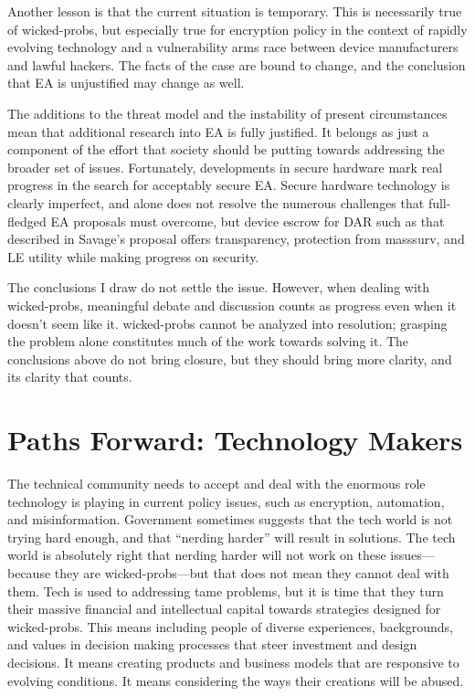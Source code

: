 Another lesson is that the current situation is temporary. This is necessarily true of \acp{wicked-prob}, but especially
true for encryption policy in the context of rapidly evolving technology and a vulnerability arms race between device
manufacturers and lawful hackers. The facts of the case are bound to change, and the conclusion that \ac{EA} is
unjustified may change as well.

The additions to the threat model and the instability of present circumstances mean that additional research into
\ac{EA} is fully justified. It belongs as just a component of the effort that society should be putting towards
addressing the broader set of issues. Fortunately, developments in secure hardware mark real progress in the search for
acceptably secure \ac{EA}. Secure hardware technology is clearly imperfect, and alone does not resolve the numerous
challenges that full-fledged \ac{EA} proposals must overcome, but device escrow for \acl{DAR} such as that described in
Savage's proposal offers transparency, protection from \ac{masssurv}, and \acl{LE} utility while making progress on
security.

The conclusions I draw do not settle the issue. However, when dealing with \acp{wicked-prob}, meaningful debate and
discussion counts as progress even when it doesn't seem like it. \Acp{wicked-prob} cannot be analyzed into resolution;
grasping the problem alone constitutes much of the work towards solving it. The conclusions above do not bring closure,
but they should bring more clarity, and its clarity that counts.


\section{Paths Forward: Technology Makers}

The technical community needs to accept and deal with the enormous role technology is playing in current policy issues,
such as encryption, automation, and misinformation. Government sometimes suggests that the tech world is not trying hard
enough, and that ``nerding harder'' will result in solutions. The tech world is absolutely right that nerding harder
will not work on these issues---because they are \acp{wicked-prob}---but that does not mean they cannot deal with them.
Tech is used to addressing tame problems, but it is time that they turn their massive financial and intellectual capital
towards strategies designed for \acp{wicked-prob}. This means including people of diverse experiences, backgrounds, and
values in decision making processes that steer investment and design decisions. It means creating products and business
models that are responsive to evolving conditions. It means considering the ways their creations will be abused.

